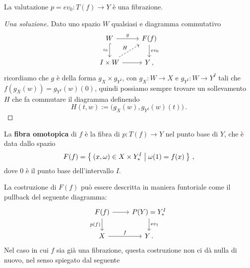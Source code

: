 \begin{exercise}
	La valutazione $p=ev_{0}:T(f) \to Y$ è una fibrazione.
	\begin{proof}[Una soluzione]
		Dato uno spazio $W$ qualsiasi e diagramma commutativo
		\begin{equation*}
			\begin{tikzcd}
				W \ar[r, "g"] \ar[d, "\iota_{0}"', hook] & F(f) \ar[d, "ev_{0}"] \\
				I \times W \ar[r] \ar[ur, "H", dashed] & Y \,,
			\end{tikzcd}
		\end{equation*}
		ricordiamo che $g$ è della forma $g_{X} \times g_{Y^{I}}$, 
		con $g_{X}:W \to X$ e $g_{Y^{I}}:W \to Y^{I}$ tali che $f(g_{X}(w))=g_{Y^{I}}(w)(0)$,
		quindi possiamo sempre trovare un sollevamento $H$ che fa commutare il diagramma
		definendo
		\begin{equation*}
			H(t,w) := \Big( g_{X}(w), g_{Y^{I}}(w)(t) \Big)\,.
		\end{equation*}
	\end{proof}
\end{exercise}

\begin{df}
	La \textbf{fibra omotopica} di $f$
	è la fibra di $p:T(f) \to Y$ nel punto base di $Y$,
	che è data dallo spazio
	\begin{equation*}
		F(f) = \Set{(x,\omega) \in X \times Y^{I}_{\ast} | \omega(1) = f(x)}\,,
	\end{equation*}
	dove $0$ è il punto base dell'intervallo $I$.
\end{df}

La costruzione di $F(f)$ può essere descritta in
maniera funtoriale come il pullback del seguente diagramma:
\begin{equation}\label{htpfib-pullback}
	\begin{tikzcd}
		F(f) \ar[r] \ar[d, "p(f)"'] & P(Y) = Y^{I}_{\ast} \ar[d, "ev_{1}"] \\
		X \ar[r, "f"] & Y \,.
	\end{tikzcd}
\end{equation}
Nel caso in cui $f$ sia già una fibrazione,
questa costruzione non ci dà nulla di nuovo,
nel senso spiegato dal seguente

